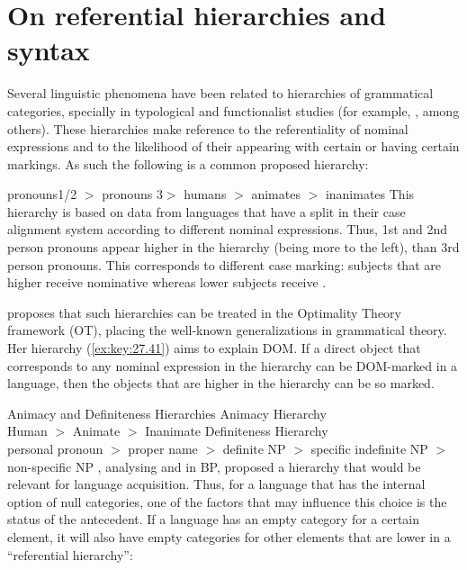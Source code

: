 \documentclass[output=paper]{langsci/langscibook}
\begin{document}
\section{On referential hierarchies and syntax}\label{sec:key:27.4}

Several linguistic phenomena have been related to hierarchies of grammatical
categories, specially in typological and functionalist studies (for example,
\citealt{Silverstein1976}, among others). These hierarchies make reference to
the referentiality of nominal expressions and to the likelihood of their
appearing with certain  or having certain markings. As
such the following is a common proposed hierarchy:

\ea\label{ex:key:27.40}
    pronouns1/2 $>$ pronouns 3$>$ humans $>$ animates $>$ inanimates \citep{Silverstein1976}
\z
This hierarchy is based on data from languages that have a split in their case
alignment system according to different nominal expressions. Thus, 1st and 2nd
person pronouns appear higher in the hierarchy (being more to the left), than
3rd person pronouns. This corresponds to different case marking: subjects that
are higher receive nominative whereas lower subjects
receive .

\textcite{Aissen1999,Aissen2003} proposes that such hierarchies can be treated
in the Optimality Theory framework (\gls{OT}), placing the
well-known generalizations in grammatical theory. Her hierarchy
(\ref{ex:key:27.41}) aims to explain DOM\@. If a direct object that corresponds
to any nominal expression in the hierarchy can be DOM-marked in a language,
then the objects that are higher in the hierarchy can be so marked.

\ea\label{ex:key:27.41} Animacy and Definiteness Hierarchies \citep{Aissen2003}
    \ea Animacy Hierarchy\\
        Human $>$ Animate $>$ Inanimate
    \ex Definiteness Hierarchy\\
        personal pronoun $>$ proper name $>$      definite NP $>$ specific
        indefinite NP $>$ non-specific NP
    \z
\z
\citet{CyrinoDuarteKato2000}, analysing  and 
in \gls{BP}, proposed a hierarchy that would be relevant for language acquisition.
Thus, for a language that has the internal option of null categories, one of
the factors that may influence this choice is the  status of the
antecedent. If a language has an empty category for a certain element, it will
also have empty categories for other elements that are lower in a ``referential
hierarchy'':
\end{document}
